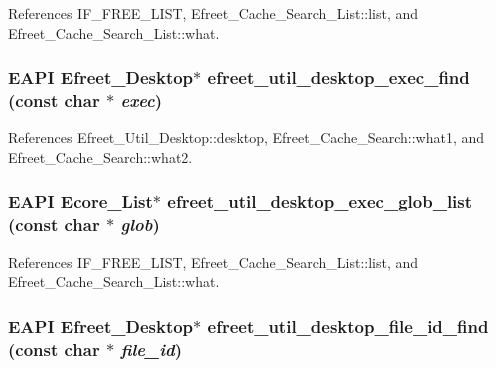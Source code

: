 References IF\_\-FREE\_\-LIST, Efreet\_\-Cache\_\-Search\_\-List::list, and Efreet\_\-Cache\_\-Search\_\-List::what.
\subsubsection[efreet\_\-util\_\-desktop\_\-exec\_\-find]{\setlength{\rightskip}{0pt plus 5cm}EAPI {\bf Efreet\_\-Desktop}$\ast$ efreet\_\-util\_\-desktop\_\-exec\_\-find (const char $\ast$ {\em exec})}\label{efreet__utils_8c_57cc0bf2b575e2e61d6a6964497b7cd7}




References Efreet\_\-Util\_\-Desktop::desktop, Efreet\_\-Cache\_\-Search::what1, and Efreet\_\-Cache\_\-Search::what2.
\subsubsection[efreet\_\-util\_\-desktop\_\-exec\_\-glob\_\-list]{\setlength{\rightskip}{0pt plus 5cm}EAPI Ecore\_\-List$\ast$ efreet\_\-util\_\-desktop\_\-exec\_\-glob\_\-list (const char $\ast$ {\em glob})}\label{efreet__utils_8c_7c89ed2bc708f7be50910457399fe5e6}




References IF\_\-FREE\_\-LIST, Efreet\_\-Cache\_\-Search\_\-List::list, and Efreet\_\-Cache\_\-Search\_\-List::what.
\subsubsection[efreet\_\-util\_\-desktop\_\-file\_\-id\_\-find]{\setlength{\rightskip}{0pt plus 5cm}EAPI {\bf Efreet\_\-Desktop}$\ast$ efreet\_\-util\_\-desktop\_\-file\_\-id\_\-find (const char $\ast$ {\em file\_\-id})}\label{efreet__utils_8c_151ee6458631eeaf609a337325b7edee}




